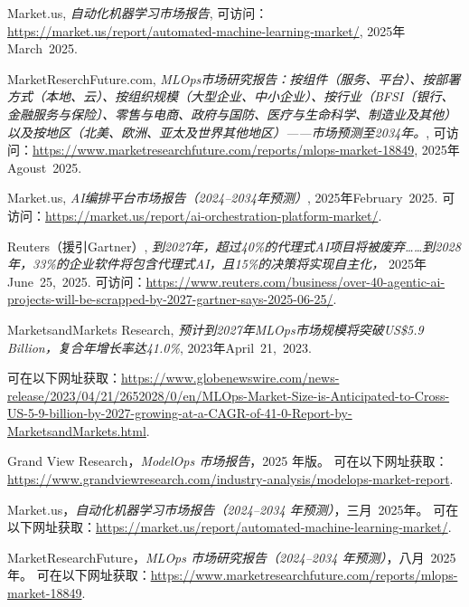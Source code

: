 \documentclass[11pt, a4paper, oneside]{article}
\begin{document}
\newpage
\begin{thebibliography}{99}
    Market.us, \textit{自动化机器学习市场报告}, 可访问：\url{https://market.us/report/automated-machine-learning-market/}, 2025年March~2025.
    
    MarketReserchFuture.com, \textit{MLOps市场研究报告：按组件（服务、平台）、按部署方式（本地、云）、按组织规模（大型企业、中小企业）、按行业（BFSI〔银行、金融服务与保险〕、零售与电商、政府与国防、医疗与生命科学、制造业及其他）以及按地区（北美、欧洲、亚太及世界其他地区）——市场预测至2034年。}, 可访问：\url{https://www.marketresearchfuture.com/reports/mlops-market-18849}, 2025年Agoust~2025.
    
    Market.us, \textit{AI编排平台市场报告（2024--2034年预测）}, 2025年February~2025.  
    可访问：\url{https://market.us/report/ai-orchestration-platform-market/}.

    Reuters（援引Gartner）, \textit{到2027年，超过40\%的代理式AI项目将被废弃……到2028年，33\%的企业软件将包含代理式AI，且15\%的决策将实现自主化，} 2025年June~25,~2025.  
    可访问：\url{https://www.reuters.com/business/over-40-agentic-ai-projects-will-be-scrapped-by-2027-gartner-says-2025-06-25/}.

    MarketsandMarkets Research, \textit{预计到2027年MLOps市场规模将突破US\$5.9 Billion，复合年增长率达41.0\%}, 2023年April~21,~2023.



可在以下网址获取：\url{https://www.globenewswire.com/news-release/2023/04/21/2652028/0/en/MLOps-Market-Size-is-Anticipated-to-Cross-US-5-9-billion-by-2027-growing-at-a-CAGR-of-41-0-Report-by-MarketsandMarkets.html}.

    Grand View Research，\textit{ModelOps 市场报告}，2025 年版。  
    可在以下网址获取：\url{https://www.grandviewresearch.com/industry-analysis/modelops-market-report}.

    Market.us，\textit{自动化机器学习市场报告（2024--2034 年预测）}，三月~2025年。  
    可在以下网址获取：\url{https://market.us/report/automated-machine-learning-market/}.

    MarketResearchFuture，\textit{MLOps 市场研究报告（2024--2034 年预测）}，八月~2025年。  
    可在以下网址获取：\url{https://www.marketresearchfuture.com/reports/mlops-market-18849}.


\end{thebibliography}
\end{document}
